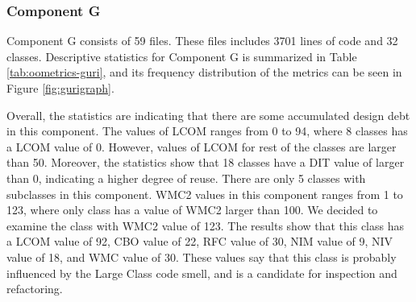 



\subsubsection{Component G}
Component G consists of 59 files. These files includes 3701 lines of code and 32 classes. Descriptive statistics for Component G is summarized in Table \ref{tab:oometrics-guri}, and its frequency distribution of the metrics can be seen in Figure \ref{fig:gurigraph}. 

Overall, the statistics are indicating that there are some accumulated design debt in this component. The values of LCOM ranges from 0 to 94, where 8 classes has a LCOM value of 0. However, values of LCOM for rest of the classes are larger than 50. Moreover, the statistics show that 18 classes have a DIT value of larger than 0, indicating a higher degree of reuse. There are only 5 classes with subclasses in this component. WMC2 values in this component ranges from 1 to 123, where only class has a value of WMC2 larger than 100. We decided to examine the class with WMC2 value of 123. The results show that this class has a LCOM value of 92, CBO value of 22, RFC value of 30, NIM value of 9, NIV value of 18, and WMC value of 30. These values say that this class is probably influenced by the Large Class code smell, and is a candidate for inspection and refactoring.



